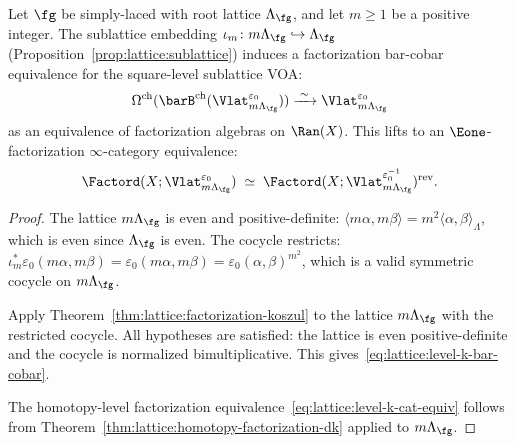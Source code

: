 \begin{proposition}
\label{prop:lattice:level-k-factorization}
Let $\fg$ be simply-laced with root lattice $\Lambda_\fg$, and
let $m \geq 1$ be a positive integer. The sublattice embedding
$\iota_m \colon m\Lambda_\fg \hookrightarrow \Lambda_\fg$
\textup{(}Proposition~\textup{\ref{prop:lattice:sublattice})} induces
a factorization bar-cobar equivalence for the square-level
sublattice VOA:
\begin{equation}\label{eq:lattice:level-k-bar-cobar}
\Omega^{\mathrm{ch}}(
 \barB^{\mathrm{ch}}(\Vlat_{m\Lambda_\fg}^{\varepsilon_0}))
\xrightarrow{\;\sim\;}
\Vlat_{m\Lambda_\fg}^{\varepsilon_0}
\end{equation}
as an equivalence of factorization algebras on $\Ran(X)$. This
lifts to an $\Eone$-factorization $\infty$-category equivalence:
\begin{equation}\label{eq:lattice:level-k-cat-equiv}
\Factord(X; \Vlat_{m\Lambda_\fg}^{\varepsilon_0})
\;\simeq\;
\Factord(X;
 \Vlat_{m\Lambda_\fg}^{\varepsilon_0^{-1}})^{\mathrm{rev}}.
\end{equation}
\end{proposition}

\begin{proof}
The lattice $m\Lambda_\fg$ is even and positive-definite:
$\langle m\alpha,m\beta\rangle =
m^2\langle\alpha,\beta\rangle_\Lambda$, which is even since
$\Lambda_\fg$ is even. The cocycle restricts:
$\iota_m^*\varepsilon_0(m\alpha,m\beta) =
\varepsilon_0(m\alpha,m\beta) =
\varepsilon_0(\alpha,\beta)^{m^2}$, which is a valid symmetric
cocycle on $m\Lambda_\fg$.

Apply Theorem~\ref{thm:lattice:factorization-koszul} to the
lattice $m\Lambda_\fg$ with the restricted cocycle. All
hypotheses are satisfied: the lattice is even positive-definite
and the cocycle is normalized bimultiplicative. This
gives~\eqref{eq:lattice:level-k-bar-cobar}.

The homotopy-level factorization equivalence~\eqref{eq:lattice:level-k-cat-equiv} follows
from Theorem~\ref{thm:lattice:homotopy-factorization-dk} applied
to $m\Lambda_\fg$.
\end{proof}

